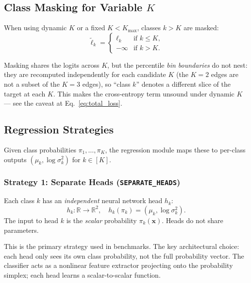 \documentclass[11pt,a4paper]{article}
\theoremstyle{definition}
\newcommand{\R}{\mathbb{R}}
\newcommand{\bx}{\mathbf{x}}
\begin{document}
\subsection{Class Masking for Variable $K$}

When using dynamic $K$ or a fixed $K < K_{\max}$, classes $k > K$ are masked:
\[
  \tilde{\ell}_k =
  \begin{cases}
    \ell_k & \text{if } k \leq K, \\
    -\infty & \text{if } k > K.
  \end{cases}
\]

\begin{implnote}
Masking shares the logits across $K$, but the percentile \emph{bin boundaries} do not nest:
they are recomputed independently for each candidate $K$ (the $K{=}2$ edges are not a subset of
the $K{=}3$ edges), so ``class $k$'' denotes a different slice of the target at each $K$. This
makes the cross-entropy term unsound under dynamic $K$ — see the caveat
at Eq.~\eqref{eq:total_loss}.
\end{implnote}

\subsection{Regression Strategies}
\label{sec:reg_strategies}

Given class probabilities $\pi_1, \ldots, \pi_K$, the regression module
maps these to per-class outputs $(\mu_k, \log\sigma_k^2)$ for $k \in [K]$.

\subsubsection{Strategy 1: Separate Heads (\texttt{SEPARATE\_HEADS})}

Each class $k$ has an \emph{independent} neural network head $h_k$:
\[
  h_k : \R \to \R^2, \quad h_k(\pi_k) = (\mu_k, \log\sigma_k^2).
\]
The input to head $k$ is the \emph{scalar} probability $\pi_k(\bx)$.
Heads do not share parameters.

\begin{implnote}
This is the primary strategy used in benchmarks. The key architectural choice:
each head only sees its own class probability, not the full probability vector.
The classifier acts as a nonlinear feature extractor projecting onto the
probability simplex; each head learns a scalar-to-scalar function.
\end{implnote}
\end{document}
